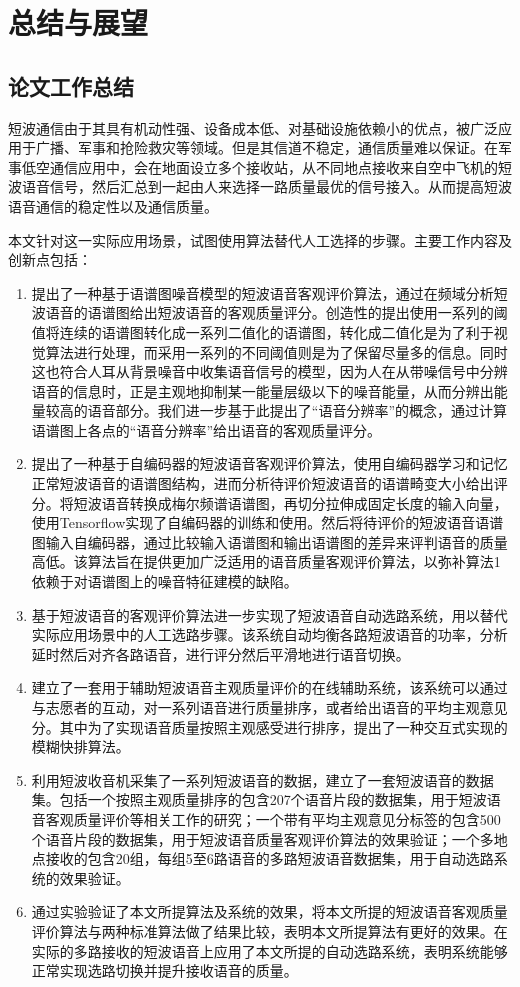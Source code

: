 \chapter{总结与展望}

\section{论文工作总结}

短波通信由于其具有机动性强、设备成本低、对基础设施依赖小的优点，被广泛应用于广播、军事和抢险救灾等领域。但是其信道不稳定，通信质量难以保证。在军事低空通信应用中，会在地面设立多个接收站，从不同地点接收来自空中飞机的短波语音信号，然后汇总到一起由人来选择一路质量最优的信号接入。从而提高短波语音通信的稳定性以及通信质量。

本文针对这一实际应用场景，试图使用算法替代人工选择的步骤。主要工作内容及创新点包括：

\begin{enumerate}
\item 提出了一种基于语谱图噪音模型的短波语音客观评价算法，通过在频域分析短波语音的语谱图给出短波语音的客观质量评分。创造性的提出使用一系列的阈值将连续的语谱图转化成一系列二值化的语谱图，转化成二值化是为了利于视觉算法进行处理，而采用一系列的不同阈值则是为了保留尽量多的信息。同时这也符合人耳从背景噪音中收集语音信号的模型，因为人在从带噪信号中分辨语音的信息时，正是主观地抑制某一能量层级以下的噪音能量，从而分辨出能量较高的语音部分。我们进一步基于此提出了“语音分辨率”的概念，通过计算语谱图上各点的“语音分辨率”给出语音的客观质量评分。
\item 提出了一种基于自编码器的短波语音客观评价算法，使用自编码器学习和记忆正常短波语音的语谱图结构，进而分析待评价短波语音的语谱畸变大小给出评分。将短波语音转换成梅尔频谱语谱图，再切分拉伸成固定长度的输入向量，使用Tensorflow实现了自编码器的训练和使用。然后将待评价的短波语音语谱图输入自编码器，通过比较输入语谱图和输出语谱图的差异来评判语音的质量高低。该算法旨在提供更加广泛适用的语音质量客观评价算法，以弥补算法1依赖于对语谱图上的噪音特征建模的缺陷。
\item 基于短波语音的客观评价算法进一步实现了短波语音自动选路系统，用以替代实际应用场景中的人工选路步骤。该系统自动均衡各路短波语音的功率，分析延时然后对齐各路语音，进行评分然后平滑地进行语音切换。
\item 建立了一套用于辅助短波语音主观质量评价的在线辅助系统，该系统可以通过与志愿者的互动，对一系列语音进行质量排序，或者给出语音的平均主观意见分。其中为了实现语音质量按照主观感受进行排序，提出了一种交互式实现的模糊快排算法。
\item 利用短波收音机采集了一系列短波语音的数据，建立了一套短波语音的数据集。包括一个按照主观质量排序的包含207个语音片段的数据集，用于短波语音客观质量评价等相关工作的研究；一个带有平均主观意见分标签的包含500个语音片段的数据集，用于短波语音质量客观评价算法的效果验证；一个多地点接收的包含20组，每组5至6路语音的多路短波语音数据集，用于自动选路系统的效果验证。
\item 通过实验验证了本文所提算法及系统的效果，将本文所提的短波语音客观质量评价算法与两种标准算法做了结果比较，表明本文所提算法有更好的效果。在实际的多路接收的短波语音上应用了本文所提的自动选路系统，表明系统能够正常实现选路切换并提升接收语音的质量。
\end{enumerate}

